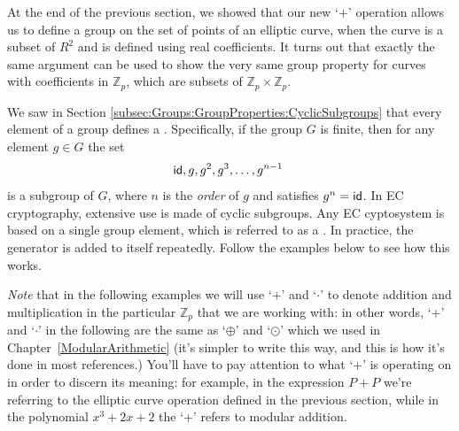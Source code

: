At the end of the previous section, we showed that our new  `+' operation allows us to define a group on the set of points of an elliptic curve, when the curve is a subset of $R^2$ and is defined using real coefficients.  It turns out that exactly the same argument can be used to show the very same group property for curves with coefficients in $\mathbb{Z}_p$, which are subsets of $\mathbb{Z}_p \times \mathbb{Z}_p$.  

We saw in Section \ref{subsec:Groups:GroupProperties:CyclicSubgroups} that every element of a group defines a . Specifically, if the group $G$ is finite, then for any element $g \in G$ the set 
\[ {\sf{i}d}, g, g^2, g^3, \ldots, g^{n-1} \ \]
is a subgroup of $G$, where $n$ is the \emph{order} of $g$ and satisfies $g^n = {\sf{i}d}$. In EC cryptography, extensive use is made of cyclic subgroups.  Any EC cyptosystem is based on a single group element, which is referred to as a .  In practice, the generator is added to itself repeatedly. Follow the examples below to see how this works.

\emph{Note} that in the following examples we will use `+'  and `$\cdot$' to denote addition and multiplication in the particular  $\mathbb{Z}_p$ that we are working with: in other words, `+' and `$\cdot$' in the following are the same as `$\oplus$' and `$\odot$' which we used in Chapter~\ref{ModularArithmetic}  (it's simpler to write this way, and this is how it's done in most references.) You'll have to pay attention to what `+' is operating on in order to discern its meaning:  for example, in the expression $P+P$ we're referring to the elliptic curve operation defined in the previous section, while in the polynomial $x^3 + 2x + 2$  the `+' refers to modular addition. 

